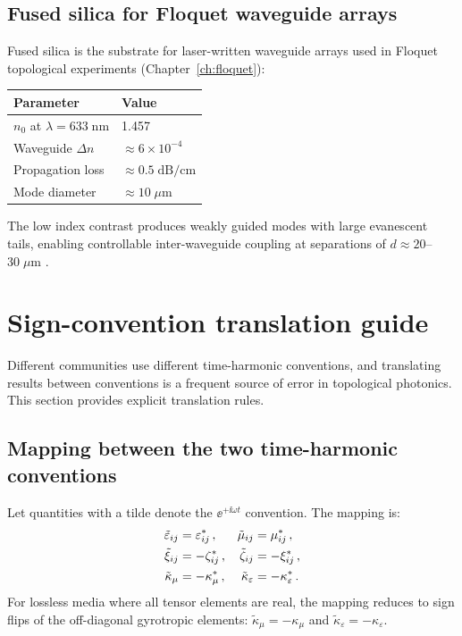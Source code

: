\subsection{Fused silica for Floquet waveguide arrays}
\label{sec:appD-silica-params}

Fused silica is the substrate for laser-written waveguide arrays
used in Floquet topological experiments
(Chapter~\ref{ch:floquet}):
\begin{center}
\begin{tabular}{ll}
  \toprule
  Parameter & Value \\
  \midrule
  $n_0$ at $\lambda=633\;\mathrm{nm}$ & 1.457 \\
  Waveguide $\Delta n$ & $\approx 6\times 10^{-4}$ \\
  Propagation loss & $\approx 0.5\;\mathrm{dB/cm}$ \\
  Mode diameter & $\approx 10\;\mu\mathrm{m}$ \\
  \bottomrule
\end{tabular}
\end{center}
The low index contrast produces weakly guided modes with large
evanescent tails, enabling controllable inter-waveguide coupling at
separations of $d\approx 20$--$30\;\mu\mathrm{m}$
\cite{rechtsman2013photonica}.


\section{Sign-convention translation guide}
\label{sec:appD-sign-translation}

Different communities use different time-harmonic conventions, and
translating results between conventions is a frequent source of error
in topological photonics.  This section provides explicit translation
rules.

\subsection{Mapping between the two time-harmonic conventions}
\label{sec:appD-mapping}

Let quantities with a tilde denote the $\ee^{+\ii\omega t}$ convention.
The mapping is:
\begin{align}\label{eq:appD-convention-map}
  \tilde{\varepsilon}_{ij} &= \varepsilon_{ij}^*\,,
  &\tilde{\mu}_{ij} &= \mu_{ij}^*\,,\notag\\
  \tilde{\xi}_{ij} &= -\zeta_{ij}^*\,,
  &\tilde{\zeta}_{ij} &= -\xi_{ij}^*\,,\notag\\
  \tilde{\kappa}_\mu &= -\kappa_\mu^*\,,
  &\tilde{\kappa}_\varepsilon &= -\kappa_\varepsilon^*\,.
\end{align}
For lossless media where all tensor elements are real, the mapping
reduces to sign flips of the off-diagonal gyrotropic elements:
$\tilde{\kappa}_\mu=-\kappa_\mu$ and
$\tilde{\kappa}_\varepsilon=-\kappa_\varepsilon$.

